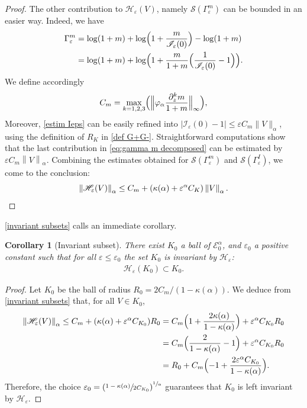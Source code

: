 \documentclass[JEP,XML,SOM,Unicode]{cedram}
\let\mathcal\mathscr
\newcommand{\cI}{\mathcal{I}}
\newcommand{\cS}{\mathcal{S}}
\theoremstyle{plain}
\newtheorem{cor}[thm]{Corollary}
\theoremstyle{definition}
\renewcommand{\H}{\mathcal{H}_\eps}
\let\eps\varepsilon
\newcommand{\nalph}[1]{\left\lVert#1\right\rVert_\alpha}
\newcommand{\Eaz}{\mathcal{E}^\alpha_0}
\newcommand{\Gammam}{\Gamma^m_{\eps}}
\newcommand{\GammaI}{\Gamma^I_{\eps}}
\newcommand{\vphia}{\varphi_\alpha}
\begin{document}
\begin{proof}
The other contribution to $\H(V)$, namely $\cS(\Gammam)$ can be bounded in an easier way. Indeed, we have
\begin{equation}\label{eq:gamma m decomposed}
\begin{split}
\Gammam &= \log(1 + m) + \log \Bigl(1 + \dfrac{m}{\cI_\eps(0)} \Bigr) - \log(1 + m)\\
&= \log(1 + m) + \log \Bigl(1 + \dfrac{m}{1 + m} \Bigl (\dfrac1{\cI_\eps(0)} - 1 \Bigr) \Bigr).
\end{split}
\end{equation}
We define accordingly
\begin{equation*}
C_m = \max_{k = 1,2,3} \Bigl (\Bigl \|\vphia \dfrac{\partial_z^{k} m}{1 + m} \Bigl \|_{\infty} \Bigl),
\end{equation*}
Moreover, \cref{estim Ieps} can be easily refined into $|\cI_\eps(0) - 1|\leq \eps C_m \|V\|_\alpha$, using the definition of $R_K$ in \eqref{def G+G-}. Straightforward computations show that the last contribution in \eqref{eq:gamma m decomposed} can be estimated by $\eps C_m \nalph{V}$. Combining the estimates obtained for $\cS(\Gammam)$ and $\cS(\GammaI)$, we come to the conclusion:
\[
\nalph{\H(V)} \leq C_m + (\kappa(\alpha) + \eps^\alpha C_K)\nalph{V}.\qedhere
\]
\end{proof}

\cref{invariant subsets} calls an immediate corollary.
\begin{cor}[Invariant subset]\label{cor invariant subset}
There exist $K_0$ a ball of $\Eaz$, and $\eps_0 $ a positive constant
such that for all $\eps \leq \eps_0$ the set $K_0$ is invariant by $\H$:
\begin{align*}
\H(K_0) \subset K_0.
\end{align*}
\end{cor}

\begin{proof}
Let $K_0$ be the ball of radius $R_0 = 2C_m/ (1 - \kappa(\alpha))$. We deduce from \cref{invariant subsets} that, for all $V\in K_0$,
\begin{align*}
\nalph{\H(V)} \leq C_m + (\kappa(\alpha) + \eps^\alpha C_{K_0})R_0 &= C_m \Bigl (1 + \dfrac{2\kappa(\alpha)}{1 - \kappa(\alpha)} \Bigr) + \eps^{\alpha} C_{K_0} R_0 \\
&= C_m \Bigl (\dfrac{2}{1 - \kappa(\alpha)} - 1 \Bigr) + \eps^{\alpha} C_{K_0} R_0 \\
& = R_0 + C_m \Bigl (-1 + \dfrac{2\eps^{\alpha} C_{K_0}}{1 - \kappa(\alpha)} \Bigr).
\end{align*}
Therefore, the choice
$\eps_0 = \left(\sfrac{1-\kappa(\alpha)}{2 C_{K_0}} \right)^{\sfrac1\alpha} $ guarantees that $K_0$ is left invariant by $\H$.
\end{proof}
\end{document}
